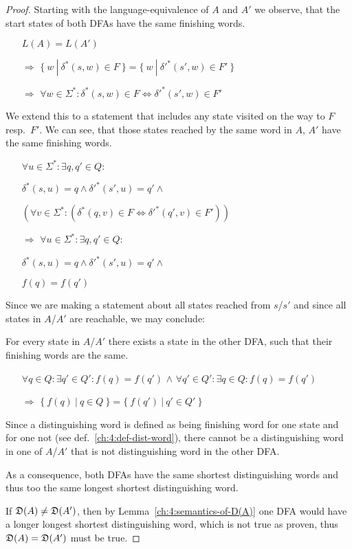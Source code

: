 \begin{proof}
	Starting with the language-equivalence of $A$ and $A'$ we observe, that the start states of both DFAs have the same finishing words.\newpage
	\begin{itemize}
		\item[] $L(A) = L(A')$
		
		\item[$\Rightarrow$] $\{\ w\ |\ \delta^*(s, w) \in F\ \} = \{\ w\ |\ \delta'^*(s', w) \in F'\ \}$
		
		\item[$\Rightarrow$] $\forall w \in \Sigma^*\colon \delta^*(s, w) \in F \Leftrightarrow \delta'^*(s', w) \in F'$
	\end{itemize}
	We extend this to a statement that includes any state visited on the way to $F$ resp.\ $F'$. We can see, that those states reached by the same word in $A$, $A'$ have the same finishing words.
	\begin{itemize}
		\item[] $\forall u \in \Sigma^*\colon \exists q,q' \in Q\colon$
		
		\qquad $\delta^*(s, u) = q \land \delta'^*(s', u) = q' \land$
		
		\qquad $(\forall v \in \Sigma^*\colon (\delta^*(q, v) \in F \Leftrightarrow \delta'^*(q', v) \in F'))$
		
		\item[$\Rightarrow$] $\forall u \in \Sigma^*\colon \exists q,q' \in Q\colon$
		
		\qquad $\delta^*(s, u) = q \land \delta'^*(s', u) = q' \land$
		
		\qquad $f(q) = f(q')$
	\end{itemize}
	Since we are making a statement about all states reached from $s$/$s'$ and since all states in $A$/$A'$ are reachable, we may conclude:
	
	For every state in $A$/$A'$ there exists a state in the other DFA, such that their finishing words are the same.
	\begin{itemize}
		\item [] $\forall q \in Q\colon \exists q' \in Q'\colon f(q) = f(q')$ \hfill $\land$ \hfill $\forall q' \in Q'\colon \exists q \in Q\colon f(q) = f(q')$ \qquad \qquad \qquad \qquad
		
		\item[$\Rightarrow$] $\{\ f(q)\ |\ q \in Q\ \} = \{\ f(q')\ |\ q' \in Q'\ \}$
	\end{itemize}
	Since a distinguishing word is defined as being finishing word for one state and for one not (see def.~\ref{ch:4:def-dist-word}), there cannot be a distinguishing word in one of $A$/$A'$ that is not distinguishing word in the other DFA.
	
	As a consequence, both DFAs have the same shortest distinguishing words and thus too the same longest shortest distinguishing word.
	
	If $\mathfrak{D}(A) \neq \mathfrak{D}(A')$, then by Lemma~\ref{ch:4:semantics-of-D(A)} one DFA would have a longer longest shortest distinguishing word, which is not true as proven, thus $\mathfrak{D}(A) = \mathfrak{D}(A')$ must be true. 
\end{proof}

